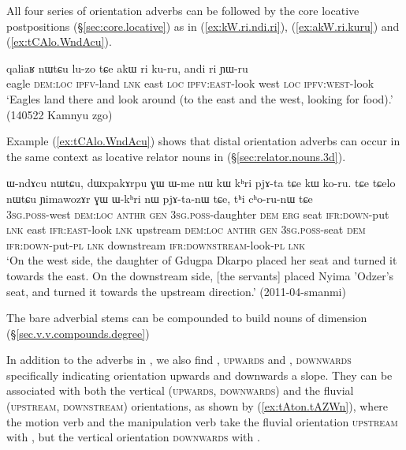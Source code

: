 All four series of orientation adverbs can be followed by the core locative postpositions (§\ref{sec:core.locative}) as in (\ref{ex:kW.ri.ndi.ri}), (\ref{ex:akW.ri.kuru}) and (\ref{ex:tCAlo.WndAcu}).

 \begin{exe}
\ex \label{ex:akW.ri.kuru}
\gll qaliaʁ nɯtɕu lu-zo tɕe akɯ ri ku-ru, andi ri ɲɯ-ru   \\
eagle \textsc{dem}:\textsc{loc} \textsc{ipfv}-land \textsc{lnk} east \textsc{loc} \textsc{ipfv}:\textsc{east}-look west \textsc{loc} \textsc{ipfv}:\textsc{west}-look \\
\glt `Eagles land there and look around (to the east and the west, looking for food).' (140522 Kamnyu zgo)
 \end{exe}
 
 Example (\ref{ex:tCAlo.WndAcu}) shows that distal orientation adverbs can occur in the same context as locative relator nouns in  (§\ref{sec:relator.nouns.3d}).

 \begin{exe}
\ex \label{ex:tCAlo.WndAcu}
\gll ɯ-ndɤcu nɯtɕu, dɯxpakɤrpu ɣɯ ɯ-me nɯ kɯ kʰri pjɤ-ta tɕe kɯ ko-ru.
tɕe tɕelo nɯtɕu ɲimawozɤr ɣɯ ɯ-kʰri nɯ pjɤ-ta-nɯ tɕe, tʰi cʰo-ru-nɯ tɕe \\
\textsc{3sg}.\textsc{poss}-west \textsc{dem}:\textsc{loc}  \textsc{anthr} \textsc{gen} \textsc{3sg}.\textsc{poss}-daughter \textsc{dem} \textsc{erg} seat \textsc{ifr}:\textsc{down}-put \textsc{lnk} east \textsc{ifr}:\textsc{east}-look  \textsc{lnk} upstream \textsc{dem}:\textsc{loc}  \textsc{anthr} \textsc{gen} \textsc{3sg}.\textsc{poss}-seat \textsc{dem} \textsc{ifr}:\textsc{down}-put-\textsc{pl} \textsc{lnk} downstream \textsc{ifr}:\textsc{downstream}-look-\textsc{pl} \textsc{lnk} \\ 
\glt `On the west side, the daughter of Gdugpa Dkarpo placed her seat and turned it towards the east. On the downstream side, [the servants] placed Nyima 'Odzer's seat, and turned it towards the upstream direction.' (2011-04-smanmi)
 \end{exe}

The bare adverbial stems can be compounded to build nouns of dimension (§\ref{sec.v.v.compounds.degree})

In addition to the adverbs in , we also find , \textsc{upwards} and , \textsc{downwards} specifically indicating orientation upwards and downwards a slope. They can be associated with both the vertical (\textsc{upwards}, \textsc{downwards}) and the fluvial (\textsc{upstream}, \textsc{downstream}) orientations, as shown by (\ref{ex:tAton.tAZWn}), where the motion verb  and the manipulation verb  take the fluvial orientation \textsc{upstream} with , but the vertical orientation \textsc{downwards} with .


